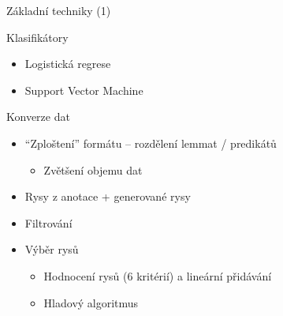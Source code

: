 \documentclass[hyperref={unicode=true}]{beamer}
\begin{document}
\begin{frame}{Základní techniky (1)}
    \begin{block}{Klasifikátory}
    \begin{itemize}
        \item Logistická regrese
        \item Support Vector Machine 
    \end{itemize}
    \end{block}

    \begin{block}{Konverze dat}
    \begin{itemize}
        \item "`Zploštení"' formátu -- rozdělení lemmat / predikátů
        \begin{itemize}\item Zvětšení objemu dat\end{itemize}
        \item Rysy z anotace + generované rysy
        \item Filtrování
        \item Výběr rysů
        \begin{itemize}
            \item Hodnocení rysů (6 kritérií) a lineární přidávání
            \item Hladový algoritmus
        \end{itemize}
    \end{itemize}
    \end{block}
\end{frame}
\end{document}

